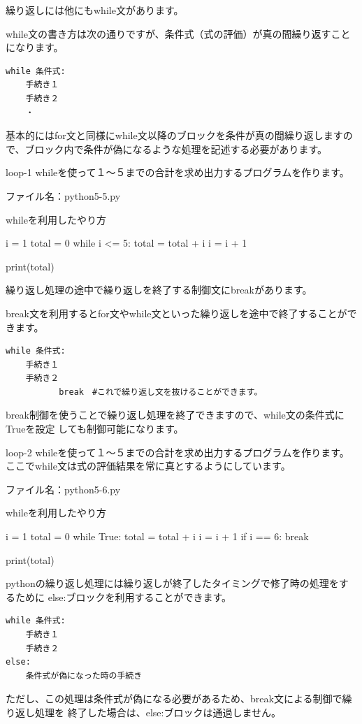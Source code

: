 \documentclass[11pt,a4paper,dvipdfmx,titlepage]{jsreport}
\begin{document}
繰り返しには他にもwhile文があります。

while文の書き方は次の通りですが、条件式（式の評価）が真の間繰り返すことになります。
\begin{verbatim}
while 条件式:
    手続き１
    手続き２
    ・
\end{verbatim}
基本的にはfor文と同様にwhile文以降のブロックを条件が真の間繰り返しますので、ブロック内で条件が偽になるような処理を記述する必要があります。
\begin{pabox}{loop-1}
whileを使って１～５までの合計を求め出力するプログラムを作ります。

ファイル名：python5-5.py
\begin{codebox}{whileを利用したやり方}
\begin{listing}{1}
i = 1
total = 0
while i <= 5:
    total = total + i
    i = i + 1

print(total)
\end{listing}
\end{codebox}
\end{pabox}
繰り返し処理の途中で繰り返しを終了する制御文にbreakがあります。

break文を利用するとfor文やwhile文といった繰り返しを途中で終了することができます。

\begin{verbatim}
while 条件式:
    手続き１
    手続き２
    　　　　break　#これで繰り返し文を抜けることができます。
\end{verbatim}

break制御を使うことで繰り返し処理を終了できますので、while文の条件式にTrueを設定
しても制御可能になります。
\begin{pabox}{loop-2}
whileを使って１～５までの合計を求め出力するプログラムを作ります。
ここでwhile文は式の評価結果を常に真とするようにしています。

ファイル名：python5-6.py
\begin{codebox}{whileを利用したやり方}
\begin{listing}{1}
i = 1
total = 0
while True:
    total = total + i
    i = i + 1
    if i == 6:
        break

print(total)
\end{listing}
\end{codebox}
\end{pabox}

pythonの繰り返し処理には繰り返しが終了したタイミングで修了時の処理をするために
else:ブロックを利用することができます。

\begin{verbatim}
while 条件式:
    手続き１
    手続き２
else:
    条件式が偽になった時の手続き
\end{verbatim}
ただし、この処理は条件式が偽になる必要があるため、break文による制御で繰り返し処理を
終了した場合は、else:ブロックは通過しません。
\end{document}
